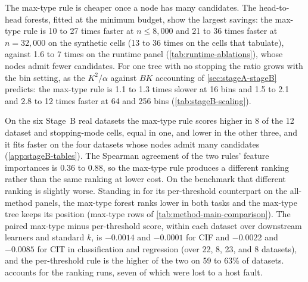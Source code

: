 The max-type rule is cheaper once a node has many candidates. The
head-to-head forests, fitted at the minimum budget, show the largest savings:
the max-type rule is 10 to 27 times faster at $n\le 8{,}000$ and 21 to 36 times
faster at $n=32{,}000$ on the synthetic cells (13 to 36 times on the cells that
\citet{MilletichDownesHirst2026citrees} tabulate), against 1.6 to 7 times on
the runtime panel (\cref{tab:runtime-ablations}), whose nodes admit fewer
candidates. For one tree with no stopping the ratio grows with the bin setting,
as the $K^2/\alpha$ against $BK$ accounting of \cref{sec:stageA-stageB}
predicts: the max-type rule is 1.1 to 1.3 times slower at 16 bins and 1.5 to
2.1 and 2.8 to 12 times faster at 64 and 256 bins (\cref{tab:stageB-scaling}).

On the six Stage~B real datasets the max-type rule scores higher in 8 of the
12 dataset and stopping-mode cells, equal in one, and lower in the other three,
and it fits faster on the four datasets whose nodes admit many candidates
(\cref{app:stageB-tables}). The Spearman
agreement of the two rules' feature importances is 0.36 to 0.88, so the
max-type rule produces a different ranking rather than the same ranking at
lower cost. On the benchmark that different ranking is slightly worse. Standing in for its
per-threshold counterpart on the all-method panels, the max-type forest ranks
lower in both tasks and the max-type tree keeps its position (max-type rows of
\cref{tab:method-main-comparison}). The paired max-type minus per-threshold
score, within each dataset over downstream learners and standard $k$, is
$-0.0014$ and $-0.0001$ for CIF and $-0.0022$ and $-0.0085$ for CIT in
classification and regression (over 22, 8, 23, and 8 datasets), and the
per-threshold rule is the higher of the two on 59 to 63\% of datasets.
 accounts for the ranking runs, seven of which were lost to a
host fault.
